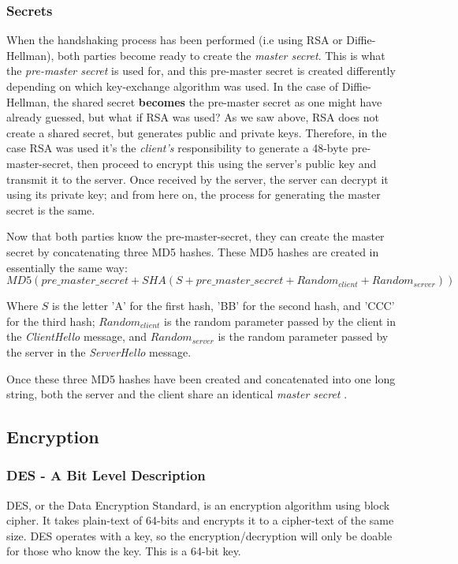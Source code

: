 \subsubsection{Secrets}
When the handshaking process has been performed (i.e using RSA or Diffie-Hellman), both parties become ready to create the \textit{master secret}. This is what the \textit{pre-master secret} is used for, and this pre-master secret is created differently depending on which key-exchange algorithm was used. In the case of Diffie-Hellman, the shared secret \textbf{becomes} the pre-master secret\cite{rfcSSLDHPreMasterSecret} as one might have already guessed, but what if RSA was used? As we saw above, RSA does not create a shared secret, but generates public and private keys. Therefore, in the case RSA was used it's the \textit{client's} responsibility to generate a 48-byte pre-master-secret, then proceed to encrypt this using the server's public key and transmit it to the server\cite{rfcSSLRSAPreMasterSecret}. Once received by the server, the server can decrypt it using its private key; and from here on, the process for generating the master secret is the same.

Now that both parties know the pre-master-secret, they can create the master secret by concatenating three MD5 hashes. These MD5 hashes are created in essentially the same way\cite{rfcSSLMasterSecret}:\\
$MD5(pre\_master\_secret + SHA(S + pre\_master\_secret + Random_{client} + Random_{server}))$

Where $S$ is the letter 'A' for the first hash, 'BB' for the second hash, and 'CCC' for the third hash; $Random_{client}$ is the random parameter passed by the client in the \textit{ClientHello} message, and $Random_{server}$ is the random parameter passed by the server in the \textit{ServerHello} message.

Once these three MD5 hashes have been created and concatenated into one long string, both the server and the client share an identical \textit{master secret} \cite{rfcSSLMasterSecret}. 

\subsection{Encryption}

\subsubsection{DES - A Bit Level Description}
DES, or the Data Encryption Standard, is an encryption algorithm using block cipher. It takes plain-text of 64-bits and encrypts it to a cipher-text of the same size. DES operates with a key, so the encryption/decryption will only be doable for those who know the key. This is a 64-bit key. \cite{des3}

